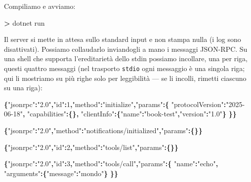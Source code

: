 \documentclass[
  italian,
  10pt,
]{book}
\newenvironment{Shaded}{\begin{snugshade}}{\end{snugshade}}
\newcommand{\DataTypeTok}[1]{\textcolor[rgb]{0.13,0.29,0.53}{#1}}
\newcommand{\DecValTok}[1]{\textcolor[rgb]{0.00,0.00,0.81}{#1}}
\newcommand{\ExtensionTok}[1]{#1}
\newcommand{\FunctionTok}[1]{\textcolor[rgb]{0.13,0.29,0.53}{\textbf{#1}}}
\newcommand{\NormalTok}[1]{#1}
\newcommand{\OperatorTok}[1]{\textcolor[rgb]{0.81,0.36,0.00}{\textbf{#1}}}
\newcommand{\StringTok}[1]{\textcolor[rgb]{0.31,0.60,0.02}{#1}}
\begin{document}
Compiliamo e avviamo:

\begin{Shaded}
\begin{Highlighting}[]
\OperatorTok{\textgreater{}}\NormalTok{ dotnet }\ExtensionTok{run}
\end{Highlighting}
\end{Shaded}

Il server si mette in attesa sullo standard input e non stampa nulla (i
log sono disattivati). Possiamo collaudarlo inviandogli a mano i
messaggi JSON-RPC. Su una shell che supporta l'ereditarietà dello stdin
possiamo incollare, una per riga, questi quattro messaggi (nel trasporto
\texttt{stdio} ogni messaggio è una singola riga; qui li mostriamo su
più righe solo per leggibilità --- se li incolli, rimetti ciascuno su
una riga):

\begin{Shaded}
\begin{Highlighting}[]
\FunctionTok{\{}\DataTypeTok{"jsonrpc"}\FunctionTok{:}\StringTok{"2.0"}\FunctionTok{,}\DataTypeTok{"id"}\FunctionTok{:}\DecValTok{1}\FunctionTok{,}\DataTypeTok{"method"}\FunctionTok{:}\StringTok{"initialize"}\FunctionTok{,}\DataTypeTok{"params"}\FunctionTok{:\{}
  \DataTypeTok{"protocolVersion"}\FunctionTok{:}\StringTok{"2025{-}06{-}18"}\FunctionTok{,}
  \DataTypeTok{"capabilities"}\FunctionTok{:\{\},}
  \DataTypeTok{"clientInfo"}\FunctionTok{:\{}\DataTypeTok{"name"}\FunctionTok{:}\StringTok{"book{-}test"}\FunctionTok{,}\DataTypeTok{"version"}\FunctionTok{:}\StringTok{"1.0"}\FunctionTok{\}}
\FunctionTok{\}\}}

\FunctionTok{\{}\DataTypeTok{"jsonrpc"}\FunctionTok{:}\StringTok{"2.0"}\FunctionTok{,}\DataTypeTok{"method"}\FunctionTok{:}\StringTok{"notifications/initialized"}\FunctionTok{,}\DataTypeTok{"params"}\FunctionTok{:\{\}\}}

\FunctionTok{\{}\DataTypeTok{"jsonrpc"}\FunctionTok{:}\StringTok{"2.0"}\FunctionTok{,}\DataTypeTok{"id"}\FunctionTok{:}\DecValTok{2}\FunctionTok{,}\DataTypeTok{"method"}\FunctionTok{:}\StringTok{"tools/list"}\FunctionTok{,}\DataTypeTok{"params"}\FunctionTok{:\{\}\}}

\FunctionTok{\{}\DataTypeTok{"jsonrpc"}\FunctionTok{:}\StringTok{"2.0"}\FunctionTok{,}\DataTypeTok{"id"}\FunctionTok{:}\DecValTok{3}\FunctionTok{,}\DataTypeTok{"method"}\FunctionTok{:}\StringTok{"tools/call"}\FunctionTok{,}\DataTypeTok{"params"}\FunctionTok{:\{}
  \DataTypeTok{"name"}\FunctionTok{:}\StringTok{"echo"}\FunctionTok{,}
  \DataTypeTok{"arguments"}\FunctionTok{:\{}\DataTypeTok{"message"}\FunctionTok{:}\StringTok{"mondo"}\FunctionTok{\}}
\FunctionTok{\}\}}
\end{Highlighting}
\end{Shaded}
\end{document}
